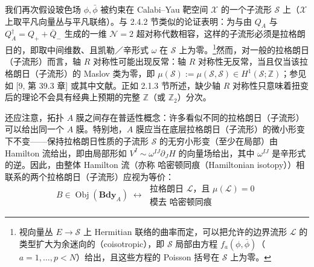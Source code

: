 我们再次假设玻色场 $\phi,\bar\phi$ 被约束在 Calabi–Yau 靶空间 $\mathcal{X}$ 的一个子流形 $\mathcal{S}$ 上（$\mathcal{X}$ 上取平凡向量丛与平凡联络）。与 2.4.2 节类似的论证表明：为与由 $Q_A$ 与 $Q_A^\dagger = Q_+ + \bar Q_-$ 生成的一维 $\mathcal{N}=2$ 超对称代数相容，这样的子流形必须是拉格朗日的，即取中间维数、且凯勒／辛形式 $\omega$ 在 $\mathcal{S}$ 上为零。\footnote{视向量丛 $E\to\mathcal{S}$ 上 Hermitian 联络的曲率而定，可以把允许的边界流形 $\mathcal{L}$ 的类型扩大为余迷向的（coisotropic），即 $\mathcal{S}$ 局部由方程 $f_a(\phi,\bar\phi)$（$a=1,\ldots,p<N$）给出，且这些方程的 Poisson 括号在 $\mathcal{S}$ 上为零。}然而，对一般的拉格朗日（子流形）而言，轴 $R$ 对称性可能出现反常：轴 $R$ 对称性无反常，当且仅当该拉格朗日（子流形）的 Maslov 类为零，即 $\mu(\mathcal{S}) := \mu(\mathcal{S},\mathcal{S}) \in H^1(\mathcal{S};\mathbb{Z})$；参见如 [9, 第 39.3 章] 或其中文献。正如 2.1.3 节所述，缺少轴 $R$ 对称性只意味着扭变后的理论不会具有经典上预期的完整 $\mathbb{Z}$（或 $\mathbb{Z}_2$）分次。

还应注意，拓扑 $A$ 膜之间存在普适性概念：许多看似不同的拉格朗日（子流形）可以给出同一个 $A$ 膜。特别地，$A$ 膜应当在底层拉格朗日（子流形）的微小形变下不变——保持拉格朗日性质的子流形 $\mathcal{S}$ 的无穷小形变（至少在局部）由 Hamilton 流给出，即由局部形如 $V^I \sim \omega^{IJ}\partial_J H$ 的向量场给出，其中 $\omega^{IJ}$ 是辛形式的逆。因此，由整体 Hamilton 流（亦称 哈密顿同痕（Hamiltonian isotopy））相联系的两个拉格朗日（子流形）应视为等价：
\begin{equation}\tag{2.48}
B \in \operatorname{Obj}(\mathbf{Bdy}_A)
\;\leftrightarrow\;
\begin{gathered}
\text{拉格朗日 } \mathcal{L}\text{，且 } \mu(\mathcal{L}) = 0\\
\text{模去 哈密顿同痕}
\end{gathered}
\end{equation}

